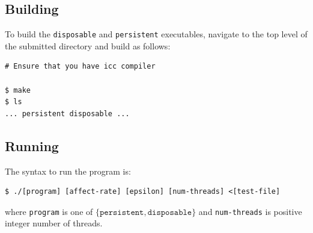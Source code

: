 \documentclass{article}
\begin{document}
\subsection*{Building}
\label{subsec:building}

To build the \texttt{disposable} and \texttt{persistent} executables, navigate
to the top level of the submitted directory and build as follows:

\begin{lstlisting}[style=DOS]
# Ensure that you have icc compiler

$ make
$ ls
... persistent disposable ...
\end{lstlisting}

\subsection*{Running}
\label{subsec:running}

The syntax to run the program is:

\begin{lstlisting}[style=DOS]
$ ./[program] [affect-rate] [epsilon] [num-threads] <[test-file]
\end{lstlisting}
where \texttt{program} is one of $\{\texttt{persistent}, \texttt{disposable}\}$
and \texttt{num-threads} is positive integer number of threads.
\end{document}
